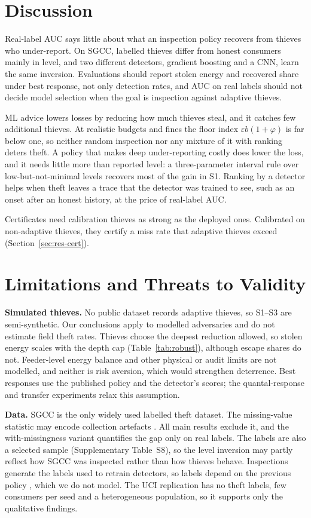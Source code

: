 \documentclass[journal]{IEEEtran}
\begin{document}
\section{Discussion}
Real-label AUC says little about what an inspection policy recovers from thieves who under-report. On SGCC, labelled thieves differ from honest consumers mainly in level, and two different detectors, gradient boosting and a CNN, learn the same inversion. Evaluations should report stolen energy and recovered share under best response, not only detection rates, and AUC on real labels should not decide model selection when the goal is inspection against adaptive thieves.

ML advice lowers losses by reducing how much thieves steal, and it catches few additional thieves. At realistic budgets and fines the floor index $\varepsilon b(1+\varphi)$ is far below one, so neither random inspection nor any mixture of it with ranking deters theft. A policy that makes deep under-reporting costly does lower the loss, and it needs little more than reported level: a three-parameter interval rule over low-but-not-minimal levels recovers most of the gain in S1. Ranking by a detector helps when theft leaves a trace that the detector was trained to see, such as an onset after an honest history, at the price of real-label AUC.

Certificates need calibration thieves as strong as the deployed ones. Calibrated on non-adaptive thieves, they certify a miss rate that adaptive thieves exceed (Section~\ref{sec:res-cert}).

\section{Limitations and Threats to Validity}\label{sec:limits}
\textbf{Simulated thieves.} No public dataset records adaptive thieves, so S1--S3 are semi-synthetic. Our conclusions apply to modelled adversaries and do not estimate field theft rates. Thieves choose the deepest reduction allowed, so stolen energy scales with the depth cap (Table~\ref{tab:robust}), although escape shares do not. Feeder-level energy balance and other physical or audit limits are not modelled, and neither is risk aversion, which would strengthen deterrence. Best responses use the published policy and the detector's scores; the quantal-response and transfer experiments relax this assumption.

\textbf{Data.} SGCC is the only widely used labelled theft dataset. The missing-value statistic may encode collection artefacts \cite{alfian2026}. All main results exclude it, and the with-missingness variant quantifies the gap only on real labels. The labels are also a selected sample (Supplementary Table~S8), so the level inversion may partly reflect how SGCC was inspected rather than how thieves behave. Inspections generate the labels used to retrain detectors, so labels depend on the previous policy \cite{lakkaraju2017}, which we do not model. The UCI replication has no theft labels, few consumers per seed and a heterogeneous population, so it supports only the qualitative findings.
\end{document}
